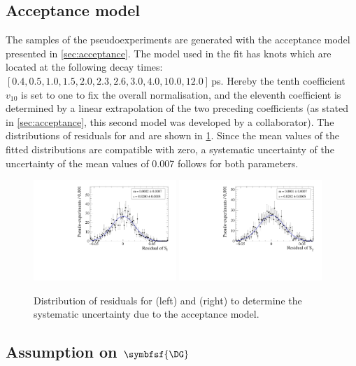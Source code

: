 \subsection*{Acceptance model}

The samples of the pseudoexperiments are generated with the acceptance model presented in \cref{sec:acceptance}.
The model used in the fit has knots which are located at the following decay times: $[0.4, 0.5, 1.0, 1.5, 2.0, 2.3, 2.6, 3.0, 4.0, 10.0, 12.0]\,$\si{\pico\second}.
Hereby the tenth coefficient $v_{10}$ is set to one to fix the overall normalisation, and the eleventh coefficient is determined by a linear extrapolation of the two preceding coefficients (as stated in \cref{sec:acceptance}, this second model was developed by a collaborator).
The distributions of residuals for \Sf and \Sfbar are shown in \cref{fig:systUncertAcc}.
Since the mean values of the fitted distributions are compatible with zero, a systematic uncertainty of the uncertainty of the mean values of  \num{0.007} follows for both \CP parameters.
\begin{figure}[tbp]
    \centering
    \includegraphics[width=0.48\textwidth]{10Systematics/figs/accept_Sf_res.pdf}
    \includegraphics[width=0.48\textwidth]{10Systematics/figs/accept_Sfbar_res.pdf}
    \caption{Distribution of residuals for \Sf (left) and \Sfbar (right) to determine the systematic uncertainty due to the acceptance model.}
    \label{fig:systUncertAcc}
\end{figure}

\subsection*{Assumption on $\symbfsf{\DG}$}

